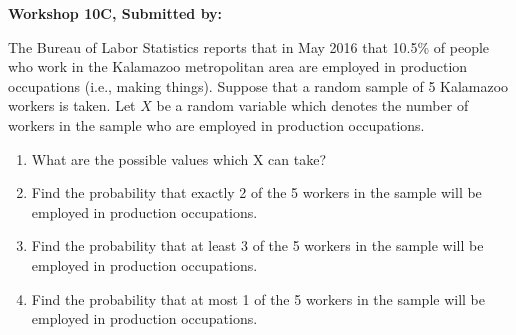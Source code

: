 \documentclass[11pt, chapterprefix=true]{scrbook}\usepackage[]{graphicx}\usepackage[]{color}
\begin{document}
\begin{exercises}
\begin{exercise}
\end{exercise} 
\begin{solution}  %

\end{solution}

    
\clearpage

   \begin{exercise}  %

    \begin{center}
\begin{flushleft}\textbf{\large \hfill Workshop 10C, Submitted by: }\end{flushleft}

\end{center}

The Bureau of Labor Statistics reports that in May 2016 that 10.5\% of people who work in the Kalamazoo metropolitan area are employed in production occupations (i.e., making things). Suppose that a random sample of 5 Kalamazoo workers is taken. Let $X$ be a random variable which denotes the number of workers in the sample who are employed in production occupations.

\begin{enumerate}
\item What are the possible values which X can take?
\item Find the probability that exactly 2 of the 5 workers in the sample will be employed in production occupations.
\item Find the probability that at least 3 of the 5 workers in the sample will be employed in production occupations.
\item Find the probability that at most 1 of the 5 workers in the sample will be employed in production occupations.
\end{enumerate}


\end{exercise}
\end{exercises}
\end{document}
